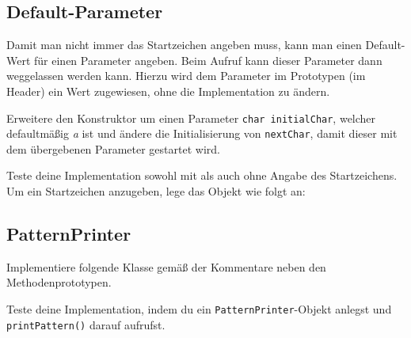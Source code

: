 
\subsection{Default-Parameter}
Damit man nicht immer das Startzeichen angeben muss, kann man einen Default-Wert für einen Parameter angeben. Beim Aufruf kann dieser Parameter dann weggelassen werden kann.
Hierzu wird dem Parameter im Prototypen (im Header) ein Wert zugewiesen, ohne die Implementation zu ändern.


Erweitere den Konstruktor um einen Parameter \lstinline{char initialChar}, welcher defaultmäßig \emph{a} ist und ändere die Initialisierung von \lstinline{nextChar}, damit dieser mit dem übergebenen Parameter gestartet wird.

Teste deine Implementation sowohl mit als auch ohne Angabe des Startzeichens.
Um ein Startzeichen anzugeben, lege das Objekt wie folgt an:



\subsection{PatternPrinter}
Implementiere folgende Klasse gemäß der Kommentare neben den Methodenprototypen.


Teste deine Implementation, indem du ein \lstinline{PatternPrinter}-Objekt anlegst und \lstinline{printPattern()} darauf aufrufst.

